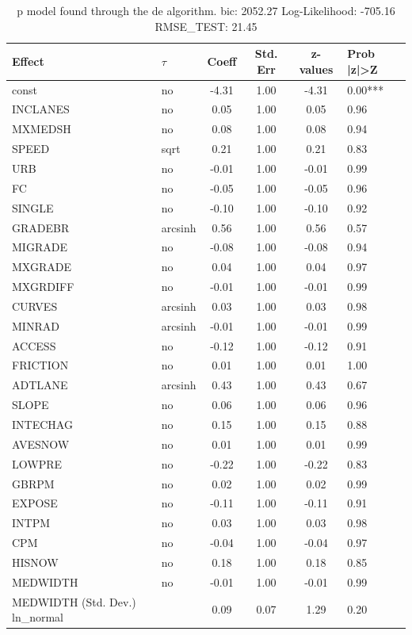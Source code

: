 \begin{table}
	\caption{p model found through the de algorithm. bic: 2052.27 Log-Likelihood: -705.16 RMSE_TEST: 21.45}
	\begin{center}
		\begin{tabular}{|l|l|c|c|c|l|}
			\hline
			Effect & $\tau$ & Coeff & Std. Err & z-values & Prob |z|>Z \\
			\hline
			const & no & -4.31 & 1.00 & -4.31 & 0.00*** \\
			\hline
			INCLANES & no & 0.05 & 1.00 & 0.05 & 0.96 \\
			\hline
			MXMEDSH & no & 0.08 & 1.00 & 0.08 & 0.94 \\
			\hline
			SPEED & sqrt & 0.21 & 1.00 & 0.21 & 0.83 \\
			\hline
			URB & no & -0.01 & 1.00 & -0.01 & 0.99 \\
			\hline
			FC & no & -0.05 & 1.00 & -0.05 & 0.96 \\
			\hline
			SINGLE & no & -0.10 & 1.00 & -0.10 & 0.92 \\
			\hline
			GRADEBR & arcsinh & 0.56 & 1.00 & 0.56 & 0.57 \\
			\hline
			MIGRADE & no & -0.08 & 1.00 & -0.08 & 0.94 \\
			\hline
			MXGRADE & no & 0.04 & 1.00 & 0.04 & 0.97 \\
			\hline
			MXGRDIFF & no & -0.01 & 1.00 & -0.01 & 0.99 \\
			\hline
			CURVES & arcsinh & 0.03 & 1.00 & 0.03 & 0.98 \\
			\hline
			MINRAD & arcsinh & -0.01 & 1.00 & -0.01 & 0.99 \\
			\hline
			ACCESS & no & -0.12 & 1.00 & -0.12 & 0.91 \\
			\hline
			FRICTION & no & 0.01 & 1.00 & 0.01 & 1.00 \\
			\hline
			ADTLANE & arcsinh & 0.43 & 1.00 & 0.43 & 0.67 \\
			\hline
			SLOPE & no & 0.06 & 1.00 & 0.06 & 0.96 \\
			\hline
			INTECHAG & no & 0.15 & 1.00 & 0.15 & 0.88 \\
			\hline
			AVESNOW & no & 0.01 & 1.00 & 0.01 & 0.99 \\
			\hline
			LOWPRE & no & -0.22 & 1.00 & -0.22 & 0.83 \\
			\hline
			GBRPM & no & 0.02 & 1.00 & 0.02 & 0.99 \\
			\hline
			EXPOSE & no & -0.11 & 1.00 & -0.11 & 0.91 \\
			\hline
			INTPM & no & 0.03 & 1.00 & 0.03 & 0.98 \\
			\hline
			CPM & no & -0.04 & 1.00 & -0.04 & 0.97 \\
			\hline
			HISNOW & no & 0.18 & 1.00 & 0.18 & 0.85 \\
			\hline
			MEDWIDTH & no & -0.01 & 1.00 & -0.01 & 0.99 \\
			\hline
			MEDWIDTH (Std. Dev.) ln_normal &  & 0.09 & 0.07 & 1.29 & 0.20 \\
			\hline
		\end{tabular}
	\end{center}
\end{table}